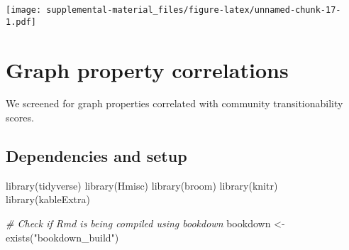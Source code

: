 \documentclass[
]{book}
\newenvironment{Shaded}{\begin{snugshade}}{\end{snugshade}}
\newcommand{\CommentTok}[1]{\textcolor[rgb]{0.56,0.35,0.01}{\textit{#1}}}
\newcommand{\FunctionTok}[1]{\textcolor[rgb]{0.00,0.00,0.00}{#1}}
\newcommand{\NormalTok}[1]{#1}
\newcommand{\OtherTok}[1]{\textcolor[rgb]{0.56,0.35,0.01}{#1}}
\newcommand{\StringTok}[1]{\textcolor[rgb]{0.31,0.60,0.02}{#1}}
\begin{document}
\texttt{[image: supplemental-material\_files/figure-latex/unnamed-chunk-17-1.pdf]}

\hypertarget{graph-property-correlations}{%
\chapter{Graph property correlations}\label{graph-property-correlations}}

We screened for graph properties correlated with community transitionability scores.

\hypertarget{dependencies-and-setup-1}{%
\section{Dependencies and setup}\label{dependencies-and-setup-1}}

\begin{Shaded}
\begin{Highlighting}[]
\FunctionTok{library}\NormalTok{(tidyverse)}
\FunctionTok{library}\NormalTok{(Hmisc)}
\FunctionTok{library}\NormalTok{(broom)}
\FunctionTok{library}\NormalTok{(knitr)}
\FunctionTok{library}\NormalTok{(kableExtra)}
\end{Highlighting}
\end{Shaded}

\begin{Shaded}
\begin{Highlighting}[]
\CommentTok{\# Check if Rmd is being compiled using bookdown}
\NormalTok{bookdown }\OtherTok{\textless{}{-}} \FunctionTok{exists}\NormalTok{(}\StringTok{"bookdown\_build"}\NormalTok{)}
\end{Highlighting}
\end{Shaded}
\end{document}
